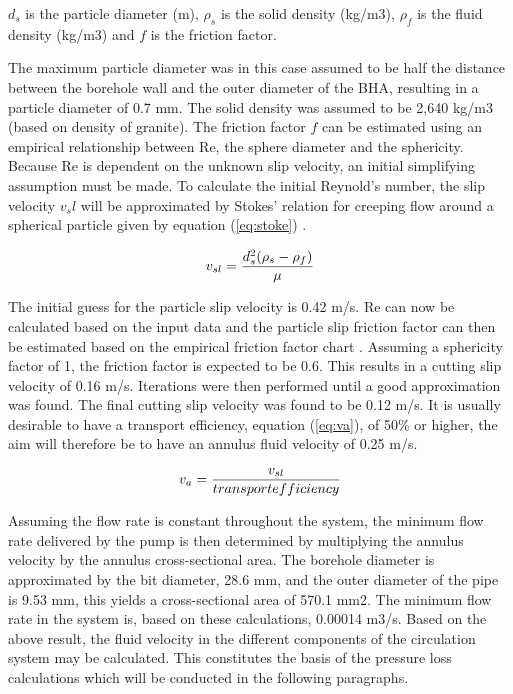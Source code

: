 $d_s$ is the particle diameter (m), $\rho_s$ is the solid density (kg/m3), $\rho_f$ is the fluid density (kg/m3) and $f$ is the friction factor.

The maximum particle diameter was in this case assumed to be half the distance between the borehole wall and the outer diameter of the BHA, resulting in a particle diameter of 0.7 mm. The solid density was assumed to be 2,640 kg/m3 (based on density of granite). The friction factor $f$ can be estimated using an empirical relationship between Re, the sphere diameter and the sphericity. Because Re is dependent on the unknown slip velocity, an initial simplifying assumption must be made. To calculate the initial Reynold’s number, the slip velocity $v_sl$ will be approximated by Stokes’ relation for creeping flow around a spherical particle given by equation (\ref{eq:stoke}) \cite{bourg}.

\begin{equation}
\centering
   v_{sl}= \frac{d_s^2 (\rho_s-\rho_f)}{\mu}
\label{eq:stoke}
\end{equation}

The initial guess for the particle slip velocity is 0.42 m/s. Re can now be calculated based on the input data and the particle slip friction factor can then be estimated based on the empirical friction factor chart \cite{bourg}. Assuming a sphericity factor of 1, the friction factor is expected to be 0.6. This results in a cutting slip velocity of 0.16 m/s. Iterations were then performed until a good approximation was found. The final cutting slip velocity was found to be 0.12 m/s.
It is usually desirable to have a transport efficiency, equation (\ref{eq:va}), of 50\% or higher, the aim will therefore be to have an annulus fluid velocity of 0.25 m/s.

\begin{equation}
\centering
   v_{a}= \frac{v_{sl}}{transport efficiency}
\label{eq:va}
\end{equation}

Assuming the flow rate is constant throughout the system, the minimum flow rate delivered by the pump is then determined by multiplying the annulus velocity by the annulus cross-sectional area. The borehole diameter is approximated by the bit diameter, 28.6 mm, and the outer diameter of the pipe is 9.53 mm, this yields a cross-sectional area of 570.1 mm2. The minimum flow rate in the system is, based on these calculations, 0.00014 m3/s.
Based on the above result, the fluid velocity in the different components of the circulation system may be calculated. This constitutes the basis of the pressure loss calculations which will be conducted in the following paragraphs.

